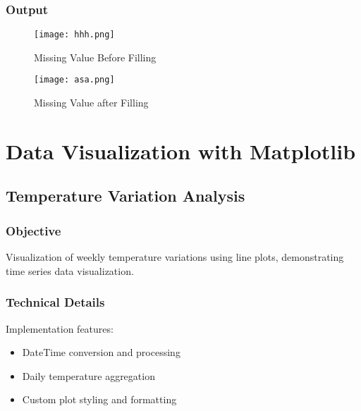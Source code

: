 \documentclass[12pt]{article}
\begin{document}
\subsubsection{Output}
\begin{figure}[!h]
    \centering
    \texttt{[image: hhh.png]}
    \caption{Missing Value Before Filling}
    \label{fig:enter-label}
\end{figure}



\begin{figure}[!h]
    \centering
    \texttt{[image: asa.png]}
    \caption{Missing Value after Filling}
    \label{fig:enter-label}
\end{figure}


\section{Data Visualization with Matplotlib}

\subsection{Temperature Variation Analysis\hfill\href{https://github.com/sabbirahmed404/Python-Practice/blob/main/matplotlib_1.py}{\faGithub}}
\subsubsection{Objective}
Visualization of weekly temperature variations using line plots, demonstrating time series data visualization.

\subsubsection{Technical Details}
Implementation features:
\begin{itemize}
    \item DateTime conversion and processing
    \item Daily temperature aggregation
    \item Custom plot styling and formatting
\end{itemize}
\end{document}
